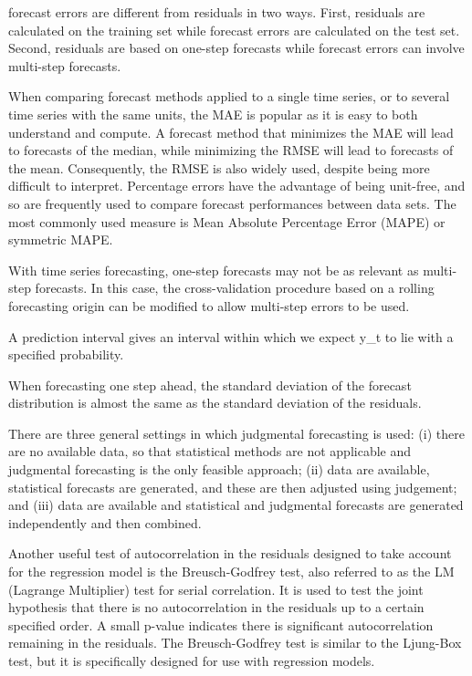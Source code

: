 \documentclass[]{book}
\begin{document}
forecast errors are different from residuals in two ways. First,
residuals are calculated on the training set while forecast errors are
calculated on the test set. Second, residuals are based on one-step
forecasts while forecast errors can involve multi-step forecasts.

When comparing forecast methods applied to a single time series, or to
several time series with the same units, the MAE is popular as it is
easy to both understand and compute. A forecast method that minimizes
the MAE will lead to forecasts of the median, while minimizing the RMSE
will lead to forecasts of the mean. Consequently, the RMSE is also
widely used, despite being more difficult to interpret. Percentage
errors have the advantage of being unit-free, and so are frequently used
to compare forecast performances between data sets. The most commonly
used measure is Mean Absolute Percentage Error (MAPE) or symmetric MAPE.

With time series forecasting, one-step forecasts may not be as relevant
as multi-step forecasts. In this case, the cross-validation procedure
based on a rolling forecasting origin can be modified to allow
multi-step errors to be used.

A prediction interval gives an interval within which we expect y\_t to
lie with a specified probability.

When forecasting one step ahead, the standard deviation of the forecast
distribution is almost the same as the standard deviation of the
residuals.

There are three general settings in which judgmental forecasting is
used: (i) there are no available data, so that statistical methods are
not applicable and judgmental forecasting is the only feasible approach;
(ii) data are available, statistical forecasts are generated, and these
are then adjusted using judgement; and (iii) data are available and
statistical and judgmental forecasts are generated independently and
then combined.

Another useful test of autocorrelation in the residuals designed to take
account for the regression model is the Breusch-Godfrey test, also
referred to as the LM (Lagrange Multiplier) test for serial correlation.
It is used to test the joint hypothesis that there is no autocorrelation
in the residuals up to a certain specified order. A small p-value
indicates there is significant autocorrelation remaining in the
residuals. The Breusch-Godfrey test is similar to the Ljung-Box test,
but it is specifically designed for use with regression models.
\end{document}
